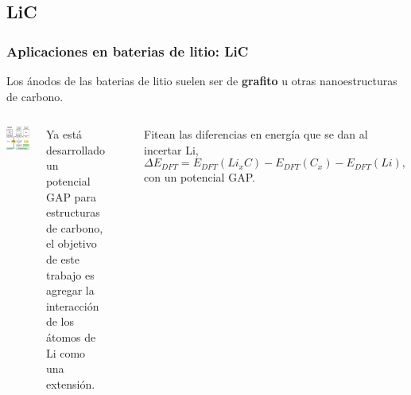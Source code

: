 \documentclass[aspectratio=169]{beamer}
\let\oldtextbf\textbf
\renewcommand{\textbf}[1]{\textcolor{nordblue}{\oldtextbf{#1}}}
\begin{document}
    \subsection{LiC}
    
    \begin{frame}
        \frametitle{Aplicaciones en baterias de litio: LiC}
            
        Los ánodos de las baterias de litio suelen ser de \textbf{grafito} u otras
        nanoestructuras de carbono.
        
        \begin{columns}
            \begin{center}
                \includegraphics[width=\columnwidth]{LiC-metodo.png}
            \end{center}

            \pause

            Ya está desarrollado un potencial GAP para estructuras de carbono, 
            el objetivo de este trabajo es agregar la interacción de los átomos
            de Li como una extensión.
            
            \ \pause

            Fitean las diferencias en energía que se dan al incertar Li,
            $$
            \Delta E_{DFT} = E_{DFT}(Li_xC) - E_{DFT}(C_x) - E_{DFT}(Li),
            $$
            con un potencial GAP.

        \end{columns}

    \end{frame}
    
\end{document}

